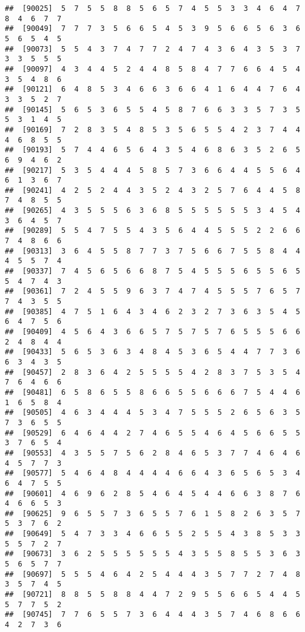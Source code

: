 \documentclass[
]{book}
\begin{document}
\begin{verbatim}
##  [90025]  5  7  5  5  8  8  5  6  5  7  4  5  5  3  3  4  6  4  7  8  4  6  7  7
##  [90049]  7  7  7  3  5  6  6  5  4  5  3  9  5  6  6  5  6  3  6  5  6  5  4  5
##  [90073]  5  5  4  3  7  4  7  7  2  4  7  4  3  6  4  3  5  3  7  3  3  5  5  5
##  [90097]  4  3  4  4  5  2  4  4  8  5  8  4  7  7  6  6  4  5  4  3  5  4  8  6
##  [90121]  6  4  8  5  3  4  6  6  3  6  6  4  1  6  4  4  7  6  4  3  3  5  2  7
##  [90145]  5  6  5  3  6  5  5  4  5  8  7  6  6  3  3  5  7  3  5  5  3  1  4  5
##  [90169]  7  2  8  3  5  4  8  5  3  5  6  5  5  4  2  3  7  4  4  4  6  8  5  5
##  [90193]  5  7  4  4  6  5  6  4  3  5  4  6  8  6  3  5  2  6  5  6  9  4  6  2
##  [90217]  5  3  5  4  4  4  5  8  5  7  3  6  6  4  4  5  5  6  4  6  1  3  6  7
##  [90241]  4  2  5  2  4  4  3  5  2  4  3  2  5  7  6  4  4  5  8  7  4  8  5  5
##  [90265]  4  3  5  5  5  6  3  6  8  5  5  5  5  5  5  3  4  5  4  3  6  4  5  7
##  [90289]  5  5  4  7  5  5  4  3  5  6  4  4  5  5  5  2  2  6  6  7  4  8  6  6
##  [90313]  3  6  4  5  5  8  7  7  3  7  5  6  6  7  5  5  8  4  4  4  5  5  7  4
##  [90337]  7  4  5  6  5  6  6  8  7  5  4  5  5  5  6  5  5  6  5  5  4  7  4  3
##  [90361]  7  2  4  5  5  9  6  3  7  4  7  4  5  5  5  7  6  5  7  7  4  3  5  5
##  [90385]  4  7  5  1  6  4  3  4  6  2  3  2  7  3  6  3  5  4  5  6  4  7  5  6
##  [90409]  4  5  6  4  3  6  6  5  7  5  7  5  7  6  5  5  5  6  6  2  4  8  4  4
##  [90433]  5  6  5  3  6  3  4  8  4  5  3  6  5  4  4  7  7  3  6  6  3  4  3  5
##  [90457]  2  8  3  6  4  2  5  5  5  5  4  2  8  3  7  5  3  5  4  7  6  4  6  6
##  [90481]  6  5  8  6  5  5  8  6  6  5  5  6  6  6  7  5  4  4  6  1  6  5  8  4
##  [90505]  4  6  3  4  4  4  5  3  4  7  5  5  5  2  6  5  6  3  5  7  3  6  5  5
##  [90529]  6  4  6  4  4  2  7  4  6  5  5  4  6  4  5  6  6  5  5  3  7  6  5  4
##  [90553]  4  3  5  5  7  5  6  2  8  4  6  5  3  7  7  4  6  4  6  4  5  7  7  3
##  [90577]  5  4  6  4  8  4  4  4  4  6  6  4  3  6  5  6  5  3  4  6  4  7  5  5
##  [90601]  4  6  9  6  2  8  5  4  6  4  5  4  4  6  6  3  8  7  6  4  6  6  5  3
##  [90625]  9  6  5  5  7  3  6  5  5  7  6  1  5  8  2  6  3  5  7  5  3  7  6  2
##  [90649]  5  4  7  3  3  4  6  6  5  5  2  5  5  4  3  8  5  3  3  5  5  7  2  7
##  [90673]  3  6  2  5  5  5  5  5  5  4  3  5  5  8  5  5  3  6  3  5  6  5  7  7
##  [90697]  5  5  5  4  6  4  2  5  4  4  4  3  5  7  7  2  7  4  8  3  5  7  4  5
##  [90721]  8  8  5  5  8  8  4  4  7  2  9  5  5  6  6  5  4  4  5  5  7  7  5  2
##  [90745]  7  7  6  5  5  7  3  6  4  4  4  3  5  7  4  6  8  6  6  4  2  7  3  6

\end{verbatim}
\end{document}
